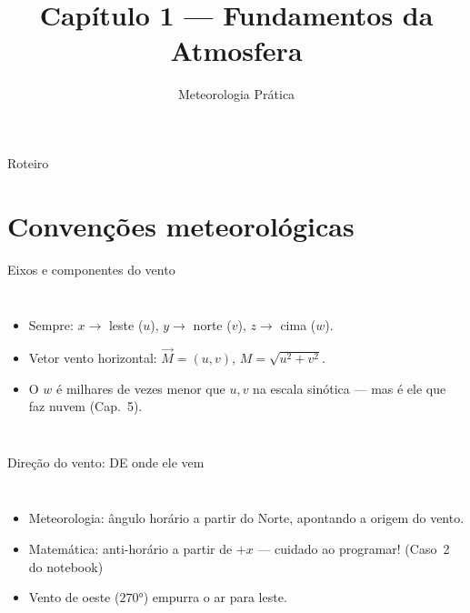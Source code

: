 \documentclass[aspectratio=169,11pt]{beamer}
\title[Cap. 1 --- Fundamentos]{Capítulo 1 --- Fundamentos da Atmosfera}
\subtitle{Meteorologia Prática}
\author{}
\date{}
\begin{document}
\begin{frame}
  \titlepage
  \vfill
  \atribuicao
\end{frame}

\begin{frame}{Roteiro}
  \tableofcontents
\end{frame}

\section{Convenções meteorológicas}

\begin{frame}{Eixos e componentes do vento}
  \begin{columns}
    \begin{itemize}
      \item Sempre: $x\to$ leste ($u$), $y\to$ norte ($v$),
            $z\to$ cima ($w$).
      \item Vetor vento horizontal: $\vec M = (u, v)$,
            $M = \sqrt{u^2+v^2}$.
      \item O $w$ é milhares de vezes menor que $u,v$ na escala sinótica —
            mas é ele que faz nuvem (Cap.~5).
    \end{itemize}
  \end{columns}
\end{frame}

\begin{frame}{Direção do vento: DE onde ele vem}
  \begin{columns}
    \begin{itemize}
      \item Meteorologia: ângulo \alert{horário a partir do Norte},
            apontando a \alert{origem} do vento.
      \item Matemática: anti-horário a partir de $+x$ — cuidado ao
            programar! (Caso~2 do notebook)
      \item Vento de oeste ($270°$) empurra o ar para leste.
    \end{itemize}
  \end{columns}
\end{frame}
\end{document}
